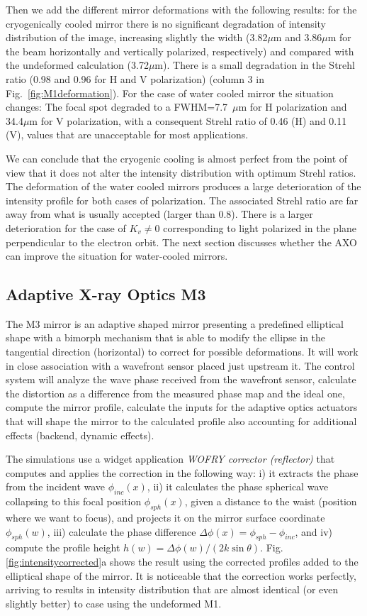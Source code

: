 \documentclass[]{spie}  %
\begin{document}
Then we add the different mirror deformations with the following results: for the cryogenically cooled mirror there is no significant degradation of intensity distribution of the image, increasing slightly the width (3.82$\mu$m and 3.86$\mu$m for the beam horizontally and vertically polarized, respectively) and compared with the undeformed calculation (3.72$\mu$m). There is a small degradation in the Strehl ratio (0.98 and 0.96 for H and V polarization) (column 3 in Fig.~\ref{fig:M1deformation}). For the case of water cooled mirror the situation changes: The focal spot degraded to a FWHM=7.7~$\mu$m for H polarization and 34.4$\mu$m for V polarization, with a consequent Strehl ratio of 0.46 (H) and 0.11 (V), values that are unacceptable for most applications. 

We can conclude that the cryogenic cooling is almost perfect from the point of view that it does not alter the intensity distribution with optimum Strehl ratios. The deformation of the water cooled mirrors produces a large deterioration of the intensity profile for both cases of polarization. The associated Strehl ratio are far away from what is usually accepted (larger than 0.8). There is a larger deterioration for the case of $K_v\ne 0$ corresponding to light polarized in the plane perpendicular to the electron orbit. The next section discusses whether the AXO can improve the situation for water-cooled mirrors.    

\subsection{Adaptive X-ray Optics M3}

The M3 mirror is an adaptive shaped mirror presenting a predefined elliptical shape with a bimorph mechanism that is able to modify the ellipse in the tangential direction (horizontal) to correct for possible deformations. It will work in close association with a wavefront sensor placed just upstream it. The control system will analyze the wave phase received from the wavefront sensor, calculate the distortion as a difference from the measured phase map and the ideal one, compute the mirror profile, calculate the inputs for the adaptive optics actuators that will shape the mirror to the calculated profile also accounting for additional effects (backend, dynamic effects).

The simulations use a widget application {\it WOFRY corrector (reflector)} that computes and applies the correction in the following way: i) it extracts the phase from the incident wave $\phi_{inc}(x)$, ii)  it calculates the phase spherical wave collapsing to this focal position $\phi_{sph}(x)$, given a distance to the waist (position where we want to focus), and projects it on the mirror surface coordinate $\phi_{sph}(w)$, iii) calculate the phase difference $\Delta \phi(x) = \phi_{sph} - \phi_{inc}$, and iv) compute the profile height $h(w) = \Delta \phi(w) / (2 k \sin \theta)$. Fig.\ref{fig:intensitycorrected}a shows the result using the corrected profiles added to the elliptical shape of the mirror. It is noticeable that the correction works perfectly, arriving to results in intensity distribution that are almost identical (or even slightly better) to case using the undeformed M1.
\end{document}
